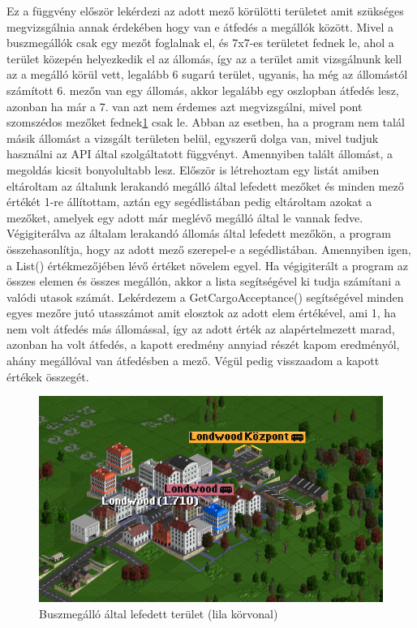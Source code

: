 Ez a függvény először lekérdezi az adott mező körülötti területet amit szükséges megvizsgálnia annak érdekében hogy van e átfedés a megállók között. Mivel a buszmegállók csak egy mezőt foglalnak el, és 7x7-es területet fednek le, ahol a terület közepén helyezkedik el az állomás, így az a terület amit vizsgálnunk kell az a megálló körül vett, legalább 6 sugarú terület, ugyanis, ha még az állomástól számított 6. mezőn van egy állomás, akkor legalább egy oszlopban átfedés lesz, azonban ha már a 7. van azt nem érdemes azt megvizsgálni, mivel pont szomszédos mezőket fednek\ref{fig:megallo} csak le. Abban az esetben, ha a program nem talál másik állomást a vizsgált területen belül, egyszerű dolga van, mivel tudjuk használni az API által szolgáltatott függvényt. Amennyiben talált állomást, a megoldás kicsit bonyolultabb lesz. Először is létrehoztam egy listát amiben eltároltam az általunk lerakandó megálló által lefedett mezőket és minden mező értékét 1-re állítottam, aztán egy segédlistában pedig eltároltam azokat a mezőket, amelyek egy adott már meglévő megálló által le vannak fedve. Végigiterálva az általam lerakandó állomás által lefedett mezőkön, a program összehasonlítja, hogy az adott mező szerepel-e a segédlistában. Amennyiben igen, a List() értékmezőjében lévő értéket növelem egyel. Ha végigiterált a program az összes elemen és összes megállón, akkor a lista segítségével ki tudja számítani a valódi utasok számát. Lekérdezem a GetCargoAcceptance() segítségével minden egyes mezőre jutó utasszámot amit elosztok az adott elem értékével, ami 1, ha nem volt átfedés más állomással, így az adott érték az alapértelmezett marad, azonban ha volt átfedés, a kapott eredmény annyiad részét kapom eredményól, ahány megállóval van átfedésben a mező. Végül pedig visszaadom a kapott értékek összegét.

\begin{figure}
	\centering
	\includegraphics[scale=0.8]{images/megallo.png}
	\caption{Buszmegálló által lefedett terület (lila körvonal)}
	\label{fig:megallo}
\end{figure}

